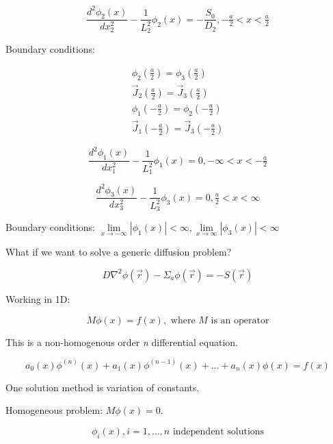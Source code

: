 \documentclass[12pt]{article}
\newcommand{\rvec}{\ensuremath{\vec{r}}}
\begin{document}
\begin{equation*}
\frac{d^2\phi_2(x)}{dx_2^2} - \frac{1}{L_2^2}\phi_2(x) = -\frac{S_0}{D_2}, -\tfrac{a}{2}<x<\tfrac{a}{2}
\end{equation*}

Boundary conditions:

\begin{gather*}
\phi_2(\tfrac{a}{2}) = \phi_3(\tfrac{a}{2}) \\
\vec{J}_2(\tfrac{a}{2}) = \vec{J}_3(\tfrac{a}{2}) \\
\phi_1(-\tfrac{a}{2}) = \phi_2(-\tfrac{a}{2}) \\
\vec{J}_1(-\tfrac{a}{2}) = \vec{J}_3(-\tfrac{a}{2}) 
\end{gather*}

\begin{equation*}
\frac{d^2\phi_1(x)}{dx_1^2} - \frac{1}{L_1^2}\phi_1(x) = 0, -\infty<x<-\tfrac{a}{2}
\end{equation*}

\begin{equation*}
\frac{d^2\phi_3(x)}{dx_3^2} - \frac{1}{L_3^2}\phi_3(x) = 0, \tfrac{a}{2}<x<\infty
\end{equation*}

Boundary conditions: 
$\lim\limits_{x\to-\infty}|\phi_1(x)| <\infty, \lim\limits_{x\to\infty}|\phi_3(x)| < \infty$

What if we want to solve a generic diffusion problem?

\begin{equation*}
D\nabla^2\phi(\rvec) - \Sigma_a\phi(\rvec) = -S(\rvec)
\end{equation*}

Working in 1D:

\begin{equation*}
M\phi(x) = f(x),\text{ where $M$ is an operator}
\end{equation*}

This is a non-homogenous order \emph{n} differential equation.

\begin{equation*}
a_0(x)\phi^{(n)}(x) + a_1(x)\phi^{(n-1)}(x) + \dotsc + a_n(x)\phi(x) = f(x)
\end{equation*}

One solution method is variation of constants.


Homogeneous problem: $M\phi(x) = 0$.

\begin{equation*}
\phi_i(x), i = 1,\dotsc, n \text{ independent solutions}
\end{equation*}
\end{document}
